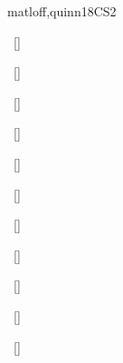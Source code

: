\begin{syllabus}
\begin{unit}{\PDParallelAlgorithmsAnalysisandProgramming}{}{matloff,quinn}{18}{CS2}
\begin{topics}%
    \item \PDParallelAlgorithmsAnalysisandProgrammingTopicCritical
    \item \PDParallelAlgorithmsAnalysisandProgrammingTopicSpeed
    \item \PDParallelAlgorithmsAnalysisandProgrammingTopicNaturally
    \item \PDParallelAlgorithmsAnalysisandProgrammingTopicParallel
    \item \PDParallelAlgorithmsAnalysisandProgrammingTopicParallelGraph
    \item \PDParallelAlgorithmsAnalysisandProgrammingTopicParallelMatrix
    \item \PDParallelAlgorithmsAnalysisandProgrammingTopicProducer
    \item \PDParallelAlgorithmsAnalysisandProgrammingTopicExamples
\end{topics}
\begin{learningoutcomes}%
        \item \PDParallelAlgorithmsAnalysisandProgrammingLODefineCritical~[\Familiarity] %
        \item \PDParallelAlgorithmsAnalysisandProgrammingLOComputeTheSpan~[\Usage] %
        \item \PDParallelAlgorithmsAnalysisandProgrammingLODefineSpeed~[\Familiarity] %
        \item \PDParallelAlgorithmsAnalysisandProgrammingLOIdentifyIndependent~[\Usage] %
        \item \PDParallelAlgorithmsAnalysisandProgrammingLOCharacterizeFeatures~[\Familiarity] %
        \item \PDParallelAlgorithmsAnalysisandProgrammingLOImplementAAnd~[\Usage] %
        \item \PDParallelAlgorithmsAnalysisandProgrammingLODecompose~[\Usage] %
        \item \PDParallelAlgorithmsAnalysisandProgrammingLOProvideAn~[\Usage] %
        \item \PDParallelAlgorithmsAnalysisandProgrammingLOGiveExamplesWhere~[\Usage] %
        \item \PDParallelAlgorithmsAnalysisandProgrammingLOImplementAAlgorithm~[\Usage] %
        \item \PDParallelAlgorithmsAnalysisandProgrammingLOIdentifyIssuesIn~[\Usage] %
\end{learningoutcomes}%
\end{unit}


\end{syllabus}
